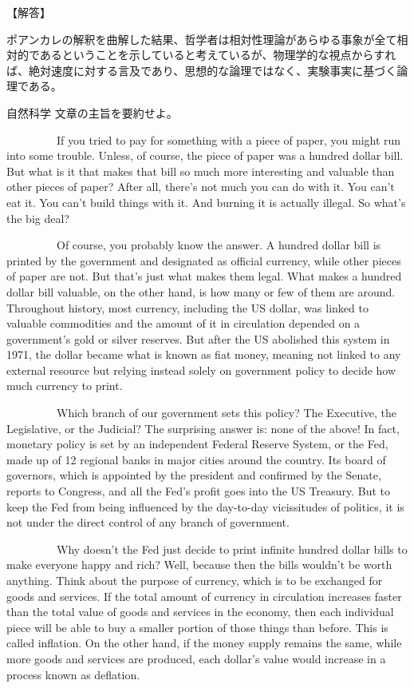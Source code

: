 \documentclass[b4paper,fleqn,dvipdfmx]{jsarticle}
\begin{document}
\begin{flushleft}
【解答】
\end{flushleft}

ポアンカレの解釈を曲解した結果、哲学者は相対性理論があらゆる事象が全て相対的であるということを示していると考えているが、物理学的な視点からすれば、絶対速度に対する言及であり、思想的な論理ではなく、実験事実に基づく論理である。



\begin{itembox}[l]{自然科学}
文章の主旨を要約せよ。\par

\ \ \ \ \ \ \ \ \ If you tried to pay for something with a piece of paper, you might run into some trouble. Unless, of course, the piece of paper was a hundred dollar bill. But what is it that makes that bill so much more interesting and valuable than other pieces of paper? After all, there's not much you can do with it. You can't eat it. You can't build things with it. And burning it is actually illegal. So what's the big deal?\par
\ \ \ \ \ \ \ \ \ Of course, you probably know the answer. A hundred dollar bill is printed by the government and designated as official currency, while other pieces of paper are not. But that's just what makes them legal. What makes a hundred dollar bill valuable, on the other hand, is how many or few of them are around. Throughout history, most currency, including the US dollar, was linked to valuable commodities and the amount of it in circulation depended on a government's gold or silver reserves. But after the US abolished this system in 1971, the dollar became what is known as fiat money, meaning not linked to any external resource but relying instead solely on government policy to decide how much currency to print. \par
\ \ \ \ \ \ \ \ \ Which branch of our government sets this policy? The Executive, the Legislative, or the Judicial? The surprising answer is: none of the above! In fact, monetary policy is set by an independent Federal Reserve System, or the Fed, made up of 12 regional banks in major cities around the country. Its board of governors, which is appointed by the president and confirmed by the Senate, reports to Congress, and all the Fed's profit goes into the US Treasury. But to keep the Fed from being influenced by the day-to-day vicissitudes of politics, it is not under the direct control of any branch of government. \par
\ \ \ \ \ \ \ \ \ Why doesn't the Fed just decide to print infinite hundred dollar bills to make everyone happy and rich? Well, because then the bills wouldn't be worth anything. Think about the purpose of currency, which is to be exchanged for goods and services. If the total amount of currency in circulation increases faster than the total value of goods and services in the economy, then each individual piece will be able to buy a smaller portion of those things than before. This is called inflation. On the other hand, if the money supply remains the same, while more goods and services are produced, each dollar's value would increase in a process known as deflation.\par

\end{itembox}
\end{document}
